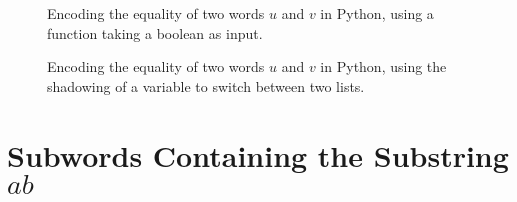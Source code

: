 \begin{figure}
    \centering
\begin{Shaded}
\begin{Highlighting}[]
    \NormalTok{:}

\OperatorTok{=} 
     
\OperatorTok{=} 
         
            \OperatorTok{==}\OperatorTok{!=}
                 
     
\end{Highlighting}
\end{Shaded}
\caption{Encoding the equality of two words $u$ and $v$ in Python,
using a function taking a boolean as input.}
\label{fig:eq-def-boolean}
\end{figure}

\begin{figure}
    \centering
\begin{Shaded}
\begin{Highlighting}[]
\OperatorTok{=}
     
\OperatorTok{=}
         
            \OperatorTok{==}\OperatorTok{!=}
                 
     
\end{Highlighting}
\end{Shaded}
\caption{Encoding the equality of two words $u$ and $v$ in Python,
using the shadowing of a variable to switch between two lists.}
\label{fig:eq-def-shadowing}
\end{figure}

\section{Subwords Containing the Substring $ab$}


